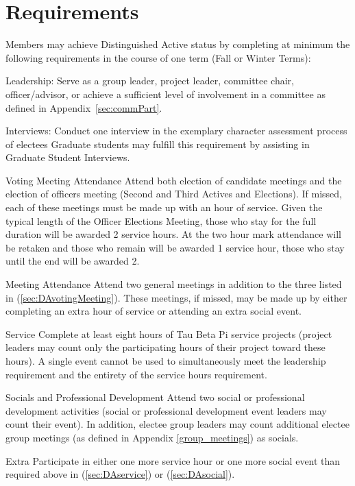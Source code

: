 \section{Requirements} Members may achieve Distinguished Active status by completing at minimum the following requirements in the course of one term (Fall or Winter Terms):
\begin{enumsubsection}
\item{Leadership:} Serve as a group leader, project leader, committee chair,  officer/advisor, or achieve a sufficient level of involvement in a committee as defined in Appendix~\ref{sec:commPart}.
\item{Interviews:} Conduct one interview in the exemplary character assessment process of electees  Graduate students may fulfill this requirement by assisting in Graduate Student Interviews.
\item{Voting Meeting Attendance}\label{sec:DAvotingMeeting} Attend both election of candidate meetings and the election of officers meeting (Second and Third Actives and Elections). If missed, each of these meetings must be made up with an hour of service. Given the typical length of the Officer Elections Meeting, those who stay for the full duration will be awarded 2 service hours. At the two hour mark attendance will be retaken and those who remain will be awarded 1 service hour, those who stay until the end will be awarded 2.
\item{Meeting Attendance} Attend two general meetings in addition to the three listed in (\ref{sec:DAvotingMeeting}). These meetings, if missed, may be made up by either completing an extra hour of service or attending an extra social event.
\item{Service}\label{sec:DAservice} Complete at least eight hours of Tau Beta Pi service projects (project leaders may count only the participating hours of their project toward these hours). A single event cannot be used to simultaneously meet the leadership requirement and the entirety of the service hours requirement.
\item{Socials and Professional Development} \label{sec:DAsocial}Attend two social or professional development activities (social or professional development event leaders may count their event). In addition, electee group leaders may count additional electee group meetings (as defined in Appendix \ref{group_meetings}) as socials.
\item{Extra} Participate in either one more service hour or one more social event than required above in (\ref{sec:DAservice}) or (\ref{sec:DAsocial}).

\end{enumsubsection}
